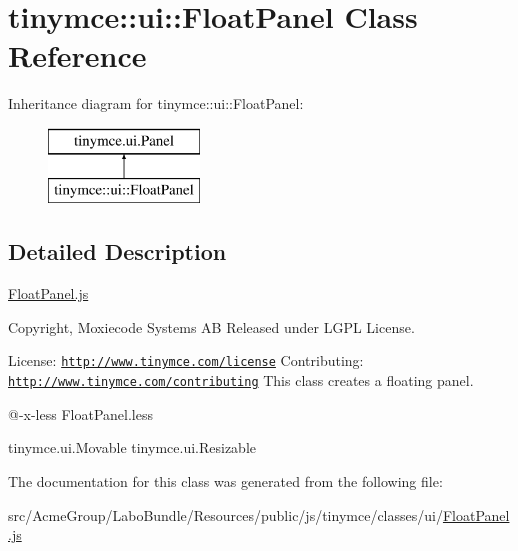 \hypertarget{classtinymce_1_1ui_1_1_float_panel}{\section{tinymce\+:\+:ui\+:\+:Float\+Panel Class Reference}
\label{classtinymce_1_1ui_1_1_float_panel}
}
Inheritance diagram for tinymce\+:\+:ui\+:\+:Float\+Panel\+:\begin{figure}[H]
\begin{center}
\leavevmode
\includegraphics[height=2.000000cm]{classtinymce_1_1ui_1_1_float_panel}
\end{center}
\end{figure}


\subsection{Detailed Description}
\hyperlink{_float_panel_8js}{Float\+Panel.\+js}

Copyright, Moxiecode Systems A\+B Released under L\+G\+P\+L License.

License\+: \href{http://www.tinymce.com/license}{\tt http\+://www.\+tinymce.\+com/license} Contributing\+: \href{http://www.tinymce.com/contributing}{\tt http\+://www.\+tinymce.\+com/contributing} This class creates a floating panel.

@-\/x-\/less Float\+Panel.\+less

tinymce.\+ui.\+Movable  tinymce.\+ui.\+Resizable 

The documentation for this class was generated from the following file\+:\begin{DoxyCompactItemize}
\item 
src/\+Acme\+Group/\+Labo\+Bundle/\+Resources/public/js/tinymce/classes/ui/\hyperlink{_float_panel_8js}{Float\+Panel.\+js}\end{DoxyCompactItemize}
